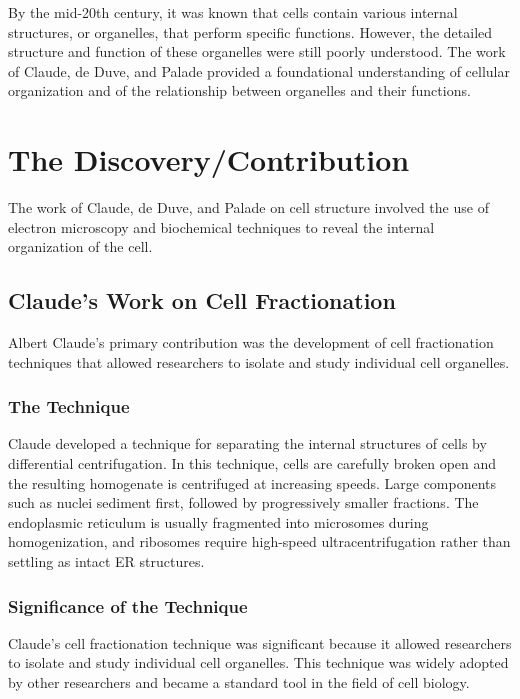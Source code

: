 By the mid-20th century, it was known that cells contain various internal structures, or organelles, that perform specific functions. However, the detailed structure and function of these organelles were still poorly understood. The work of Claude, de Duve, and Palade provided a foundational understanding of cellular organization and of the relationship between organelles and their functions.

\section{The Discovery/Contribution}

The work of Claude, de Duve, and Palade on cell structure involved the use of electron microscopy and biochemical techniques to reveal the internal organization of the cell.

\subsection{Claude's Work on Cell Fractionation}

Albert Claude's primary contribution was the development of cell fractionation techniques that allowed researchers to isolate and study individual cell organelles.

\subsubsection{The Technique}

Claude developed a technique for separating the internal structures of cells by differential centrifugation. In this technique, cells are carefully broken open and the resulting homogenate is centrifuged at increasing speeds. Large components such as nuclei sediment first, followed by progressively smaller fractions. The endoplasmic reticulum is usually fragmented into microsomes during homogenization, and ribosomes require high-speed ultracentrifugation rather than settling as intact ER structures.

\subsubsection{Significance of the Technique}

Claude's cell fractionation technique was significant because it allowed researchers to isolate and study individual cell organelles. This technique was widely adopted by other researchers and became a standard tool in the field of cell biology.

